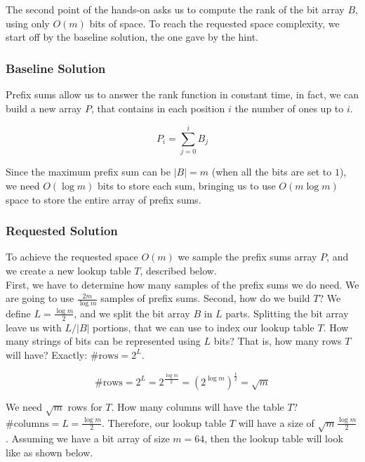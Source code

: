 \documentclass{article}
\begin{document}
The second point of the hands-on asks us to compute the rank of the bit array $B$, using only $O(m)$ bits of space. To reach the requested space complexity,
we start off by the baseline solution, the one gave by the hint.\\

\subsubsection{Baseline Solution}

\noindent Prefix sums allow us to answer the rank function in constant time, in fact, we can build a new array $P$, that contains in each position $i$ the number of ones
up to $i$.

\begin{equation}
    P_i = \sum_{j = 0}^{i} B_j
\end{equation}

\noindent Since the maximum prefix sum can be $|B| = m$ (when all the bits are set to $1$), we need $O(\log m)$ bits to store each sum, bringing us to use
$O(m \log m)$ space to store the entire array of prefix sums.\\

\subsubsection{Requested Solution}

\noindent To achieve the requested space $O(m)$ we sample the prefix sums array $P$, and we create a new lookup table $T$, described below.\\

\noindent First, we have to determine how many samples
of the prefix sums we do need. We are going to use $\frac{2m}{\log m}$ samples of prefix sums. Second, how do we build $T$? We define $L = \frac{\log m}{2}$, and we split the bit array $B$
in $L$ parts. Splitting the bit array leave us with $L/|B|$ portions, that we can use to index our lookup table $T$. 
How many strings of bits can be represented using $L$ bits? That is, how many rows $T$ will have? Exactly: $\#\textrm{rows} = 2^L$.

\begin{equation}
    \textrm{\#rows} = 2^L = 2^{\frac{\log m}{2}} = (2^{\log m})^{\frac{1}{2}} = \sqrt m
\end{equation}

\noindent We need $\sqrt m$ rows for $T$. How many columns will have the table $T$? $\# \textrm{columns} = L = \frac{\log m}{2}$. Therefore, our lookup table $T$ will have a size of $\sqrt m \frac{\log m}{2}$.
Assuming we have a bit array of size $m = 64$, then the lookup table will look like as shown below.
\end{document}
